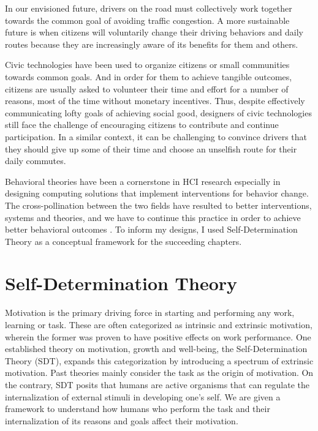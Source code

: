 In our envisioned future, drivers on the road must collectively work together towards the common goal of avoiding traffic congestion. A more sustainable future is when citizens will voluntarily change their driving behaviors and daily routes because they are increasingly aware of its benefits for them and others.

Civic technologies have been used to organize citizens or small communities towards common goals. And in order for them to achieve tangible outcomes, citizens are usually asked to volunteer their time and effort for a number of reasons, most of the time without monetary incentives. Thus, despite effectively communicating lofty goals of achieving social good, designers of civic technologies still face the challenge of encouraging citizens to contribute and continue participation. In a similar context, it can be challenging to convince drivers that they should give up some of their time and choose an unselfish route for their daily commutes. 

Behavioral theories have been a cornerstone in HCI research especially in designing computing solutions that implement interventions for behavior change. The cross-pollination between the two fields have resulted to better interventions, systems and theories, and we have to continue this practice in order to achieve better behavioral outcomes \cite{hekler2013mind}. To inform my designs, I used Self-Determination Theory as a conceptual framework for the succeeding chapters.   

\section{Self-Determination Theory}
Motivation is the primary driving force in starting and performing any work, learning or task. These are often categorized as intrinsic and extrinsic motivation, wherein the former was proven to have positive effects on work performance\cite{gagne2005self}. One established theory on motivation, growth and well-being, the Self-Determination Theory (SDT)\cite{ryan2000intrinsic}, expands this categorization by introducing a spectrum of extrinsic motivation\cite{ryan2017self,deci2000and,deci2004handbook}. Past theories mainly consider the task as the origin of motivation. On the contrary, SDT posits that humans are active organisms that can regulate the internalization of external stimuli in developing one's self. We are given a framework to understand how humans who perform the task and their internalization of its reasons and goals affect their motivation\cite{ryan2013humans}. 

